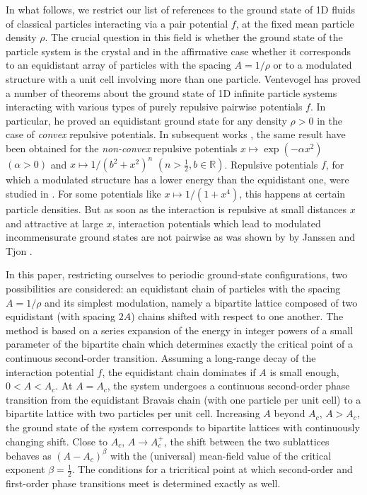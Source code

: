\documentclass[12pt]{iopart}
\theoremstyle{definition}
\begin{document}
In what follows, we restrict our list of references to the ground state of
1D fluids of classical particles interacting via a pair potential $f$,
at the fixed mean particle density $\rho$.
The crucial question in this field is whether the ground state of the
particle system is the crystal and in the affirmative case whether it
corresponds to an equidistant array of particles with the spacing $A=1/\rho$
or to a modulated structure with a unit cell involving more than one particle.
Ventevogel \cite{Ventevogel78} has proved a number of theorems about
the ground state of 1D infinite particle systems interacting with various
types of purely repulsive pairwise potentials $f$. 
In particular, he proved an equidistant ground state for any density $\rho>0$
in the case of {\em convex} repulsive potentials.
In subsequent works \cite{Ventevogel79a,Ventevogel79b}, the same result
have been obtained for the {\em non-convex} repulsive potentials
$x\mapsto\exp(-\alpha x^2)$ $(\alpha>0)$ and
$x\mapsto 1/(b^2+x^2)^n$ $(n>\frac{1}{2}, b\in \mathbb{R})$.
Repulsive potentials $f$, for which a modulated structure has a lower
energy than the equidistant one, were studied in \cite{Nijboer85}.
For some potentials like $x\mapsto 1/(1+x^4)$, this happens at certain
particle densities.
But as soon as the interaction is repulsive at small distances $x$ and
attractive at large $x$, interaction potentials which lead to modulated
incommensurate ground states are not pairwise as was shown by
by Janssen and Tjon \cite{Janssen82,Janssen83}.

In this paper, restricting ourselves to periodic ground-state configurations,
two possibilities are considered: an equidistant chain of particles with
the spacing $A=1/\rho$ and its simplest modulation, namely a bipartite
lattice composed of two equidistant (with spacing $2A$) chains
shifted with respect to one another.
The method is based on a series expansion of the energy in
integer powers of a small parameter of the bipartite chain which determines
exactly the critical point of a continuous second-order transition.
Assuming a long-range decay of the interaction potential $f$,
the equidistant chain dominates if $A$ is small enough, $0<A<A_c$.
At $A=A_c$, the system undergoes a continuous second-order phase transition
from the equidistant Bravais chain (with one particle per unit cell)
to a bipartite lattice with two particles per unit cell.
Increasing $A$ beyond $A_c$, $A>A_c$, the ground state of the system
corresponds to bipartite lattices with continuously changing shift. 
Close to $A_c$, $A\to A_c^+$, the shift between the two sublattices behaves
as $(A-A_c)^{\beta}$ with the (universal) mean-field value of
the critical exponent $\beta=\frac{1}{2}$. 
The conditions for a tricritical point at which second-order and first-order
phase transitions meet \cite{Griffiths70,Landau37,Landau80} is determined
exactly as well. 
\end{document}
